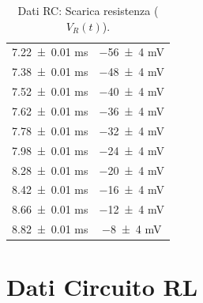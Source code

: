 \documentclass[a4paper]{article}
\begin{document}
\begin{appendices}
\begin{table}[htbp]
\begin{minipage}{0.48\textwidth}
\begin{tabular}{|c|c|}
        \num{7.22 \pm 0.01} \si{\milli\second} & \num{-56 \pm 4} \si{\milli\volt} \\
        \num{7.38 \pm 0.01} \si{\milli\second} & \num{-48 \pm 4} \si{\milli\volt} \\
        \num{7.52 \pm 0.01} \si{\milli\second} & \num{-40 \pm 4} \si{\milli\volt} \\
        \num{7.62 \pm 0.01} \si{\milli\second} & \num{-36 \pm 4} \si{\milli\volt} \\
        \num{7.78 \pm 0.01} \si{\milli\second} & \num{-32 \pm 4} \si{\milli\volt} \\
        \num{7.98 \pm 0.01} \si{\milli\second} & \num{-24 \pm 4} \si{\milli\volt} \\
        \num{8.28 \pm 0.01} \si{\milli\second} & \num{-20 \pm 4} \si{\milli\volt} \\
        \num{8.42 \pm 0.01} \si{\milli\second} & \num{-16 \pm 4} \si{\milli\volt} \\
        \num{8.66 \pm 0.01} \si{\milli\second} & \num{-12 \pm 4} \si{\milli\volt} \\
        \num{8.82 \pm 0.01} \si{\milli\second} & \num{-8 \pm 4} \si{\milli\volt} \\
        \hline
        \end{tabular}
        \caption{Dati RC: Scarica resistenza ($V_R(t)$).}
        \label{tab:rc_data_scarica_r}
    \end{minipage}
\end{table}

\newpage %

\section{Dati Circuito RL} \label{app:dati_rl}
\setcounter{table}{0} %


\end{appendices}
\end{document}
